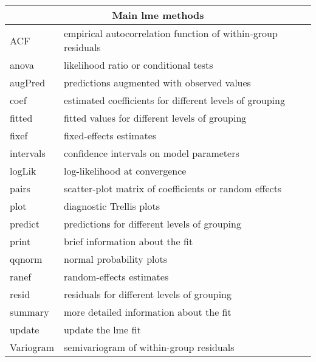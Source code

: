 \documentclass{beamer}
\begin{document}
{\footnotesize
\begin{frame}
\begin{center}
	\begin{tabular}{|l|l|}
		\hline
		\multicolumn{2}{|c|}{Main lme methods } \\
		\hline
		ACF & empirical autocorrelation function of within-group residuals\\
		anova & likelihood ratio or conditional tests \\
		augPred & predictions augmented with observed values \\
		coef & estimated coefficients for different levels of grouping \\
		fitted & fitted values for different levels of grouping \\
		fixef  & fixed-effects estimates \\
		intervals & confidence intervals on model parameters \\
		logLik & log-likelihood at convergence \\
		pairs  & scatter-plot matrix of coefficients or random effects \\
		plot & diagnostic Trellis plots \\
		predict & predictions for different levels of grouping \\
		print & brief information about the fit \\
		qqnorm & normal probability plots \\
		ranef & random-effects estimates \\
		resid & residuals for different levels of grouping \\
		summary & more detailed information about the fit\\
		update & update the lme fit \\
		Variogram& semivariogram of within-group residuals\\
		\hline
	\end{tabular}
\end{center} 
\end{frame}

}
\end{document}
